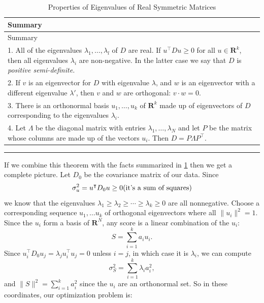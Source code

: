 \documentclass[
]{article}
\begin{document}
\begin{longtable}[]{@{}l@{}}
\caption{Properties of Eigenvalues of Real Symmetric Matrices
\label{tbl:symmmat}}\tabularnewline
\toprule
\begin{minipage}[b]{0.97\columnwidth}\raggedright
Summary\strut
\end{minipage}\tabularnewline
\midrule
\endfirsthead
\toprule
\begin{minipage}[b]{0.97\columnwidth}\raggedright
Summary\strut
\end{minipage}\tabularnewline
\midrule
\endhead
\begin{minipage}[t]{0.97\columnwidth}\raggedright
1. All of the eigenvalues \(\lambda_{1},\ldots, \lambda_{l}\) of \(D\)
are real. If \(u^{\intercal}Du\ge 0\) for all \(u\in\mathbf{R}^{k}\),
then all eigenvalues \(\lambda_{i}\) are non-negative. In the latter
case we say that \(D\) is \emph{positive semi-definite.}\strut
\end{minipage}\tabularnewline
\begin{minipage}[t]{0.97\columnwidth}\raggedright
2. If \(v\) is an eigenvector for \(D\) with eigenvalue \(\lambda\), and
\(w\) is an eigenvector with a different eigenvalue \(\lambda'\), then
\(v\) and \(w\) are orthogonal: \(v\cdot w = 0\).\strut
\end{minipage}\tabularnewline
\begin{minipage}[t]{0.97\columnwidth}\raggedright
3. There is an orthonormal basis \(u_{1},\ldots, u_{k}\) of
\(\mathbf{R}^{k}\) made up of eigenvectors of \(D\) corresponding to the
eigenvalues \(\lambda_{i}\).\strut
\end{minipage}\tabularnewline
\begin{minipage}[t]{0.97\columnwidth}\raggedright
4. Let \(\Lambda\) be the diagonal matrix with entries
\(\lambda_{1},\ldots, \lambda_{N}\) and let \(P\) be the matrix whose
columns are made up of the vectors \(u_{i}\). Then
\(D = P\Lambda P^{\intercal}.\)\strut
\end{minipage}\tabularnewline
\bottomrule
\end{longtable}

\begin{center}\rule{0.5\linewidth}{0.5pt}\end{center}

If we combine this theorem with the facts summarized in
\cref{tbl:symmmat} then we get a complete picture. Let \(D_{0}\) be the
covariance matrix of our data. Since \[
\sigma_{u}^2 = u^{\intercal}D_{0}u\ge 0 \hbox{(it's a sum of squares)}
\] we know that the eigenvalues
\(\lambda_{1}\ge\lambda_{2}\ge \cdots \ge \lambda_{k}\ge 0\) are all
nonnegative. Choose a corresponding sequence \(u_{1},\ldots u_{k}\) of
orthogonal eigenvectors where all \(\|u_{i}\|^2=1\). Since the \(u_{i}\)
form a basis of \(\mathbf{R}^{N}\), any score is a linear combination of
the \(u_{i}\): \[
S = \sum_{i=1}^{k} a_{i}u_{i}.
\] Since
\(u_{i}^{\intercal}D_{0}u_{j} = \lambda_{j}u_{i}^{\intercal}u_{j} = 0\)
unless \(i=j\), in which case it is \(\lambda_{i}\), we can compute \[
\sigma_{S}^2 = \sum_{i=1}^{k} \lambda_{i}a_{i}^2,
\] and \(\|S\|^2=\sum_{i=1}^{k} a_{i}^2\) since the \(u_{i}\) are an
orthonormal set. So in these coordinates, our optimization problem is:
\end{document}
